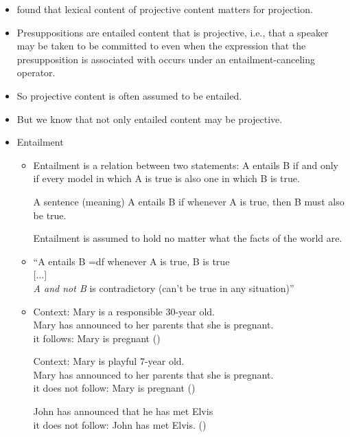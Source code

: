 \documentclass[11pt,fleqn]{article}
\newcommand{\6}{\mbox{$[\hspace*{-.6mm}[$}}
\newcommand{\9}{\mbox{$]\hspace*{-.6mm}]$}}
\begin{document}
\begin{itemize}

\item \citealt*{tbd-variability} found that lexical content of projective content matters for projection.

\item Presuppositions are entailed content that is projective, i.e., that a speaker may be taken to be committed to even when the expression that the presupposition is associated with occurs under an entailment-canceling operator.

\item So projective content is often assumed to be entailed.

\item But we know that not only entailed content may be projective.

\item Entailment

\begin{itemize}

\item Entailment is a relation between two statements: A entails B if and only if every model in which A is true is also one in which B is true. 

A sentence (meaning) A entails B if whenever A is true, then B must also be true. 

Entailment is assumed to hold no matter what the facts of the world are.

\item \citealt[19f.]{ccmg90} ``A entails B =df whenever A is true, B is true \\ {[}...{]} \\  {\em A and not B} is contradictory (can't be true in any situation)''

\item \citealt{schlenker10}

\begin{exe}
\ex 
\begin{xlist}
\ex Context: Mary is a responsible 30-year old. 
\\ Mary has announced to her parents that she is pregnant. 
\\ it follows: Mary is pregnant \hfill (\citealt[139]{schlenker10})

\ex Context: Mary is playful 7-year old.
\\ Mary has announced to her parents that she is pregnant. 
\\ it does not follow: Mary is pregnant \hfill (\citealt[140]{schlenker10})

\ex John has announced that he has met Elvis
\\ it does not follow: John has met Elvis. \hfill (\citealt[140]{schlenker10})
\end{xlist}
\end{exe}

\end{itemize}

\end{itemize}
\end{document}
